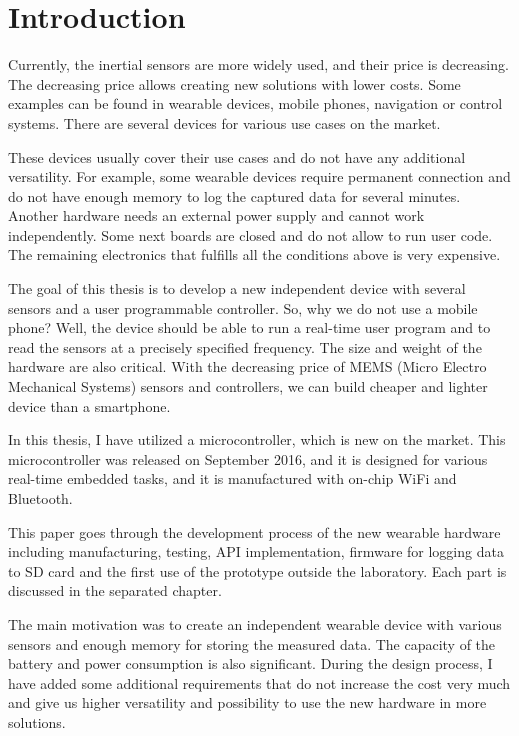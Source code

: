 \chapter{Introduction}
Currently, the inertial sensors are more widely used, and their price is decreasing. The decreasing price allows creating new solutions with lower costs. Some examples can be found in wearable devices, mobile phones, navigation or control systems. There are several devices for various use cases on the market.

These devices usually cover their use cases and do not have any additional versatility. For example, some wearable devices require permanent connection and do not have enough memory to log the captured data for several minutes. Another hardware needs an external power supply and cannot work independently. Some next boards are closed and do not allow to run user code. The remaining electronics that fulfills all the conditions above is very expensive.

The goal of this thesis is to develop a new independent device with several sensors and a user programmable controller. So, why we do not use a mobile phone? Well, the device should be able to run a real-time user program and to read the sensors at a precisely specified frequency. The size and weight of the hardware are also critical. With the decreasing price of MEMS (Micro Electro Mechanical Systems) sensors and controllers, we can build cheaper and lighter device than a smartphone.

In this thesis, I have utilized a microcontroller, which is new on the market. This microcontroller was released on September 2016, and it is designed for various real-time embedded tasks, and it is manufactured with on-chip WiFi and Bluetooth.

This paper goes through the development process of the new wearable hardware including manufacturing, testing, API implementation, firmware for logging data to SD card and the first use of the prototype outside the laboratory. Each part is discussed in the separated chapter.

The main motivation was to create an independent wearable device with various sensors and enough memory for storing the measured data. The capacity of the battery and power consumption is also significant. During the design process, I have added some additional requirements that do not increase the cost very much and give us higher versatility and possibility to use the new hardware in more solutions.

